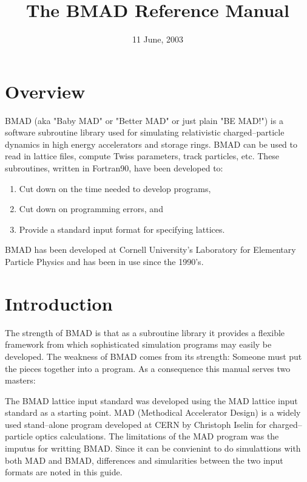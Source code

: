 \documentclass{book}
\begin{document}
\title{The BMAD Reference Manual}

\date{11 June, 2003}
\maketitle

\section*{Overview}

BMAD (aka "Baby MAD" or "Better MAD" or just plain "BE MAD!")
is a software subroutine library used for simulating 
relativistic charged--particle dynamics in high energy accelerators
and storage rings. BMAD can be used to read in lattice files, compute 
Twiss parameters, track particles, etc. 
These subroutines, written in  Fortran90, have been developed to:
\begin{enumerate}
\item Cut down on the time needed to develop programs,
\item Cut down on programming errors, and
\item Provide a standard input format for specifying lattices.
\end{enumerate}
BMAD has been developed at Cornell University's Laboratory for Elementary
Particle Physics and has been in use since the 1990's.

\break
\section*{Introduction}

The strength of BMAD is that as a subroutine library it provides a flexible
framework from which sophisticated simulation programs may easily be developed.
The weakness of BMAD comes from its strength: Someone must put the pieces 
together into a program. As a consequence this manual serves two masters:

The BMAD lattice input standard was developed using the MAD lattice
input standard as a starting point. MAD (Methodical Accelerator
Design) is a widely used stand--alone program developed at CERN by
Christoph Iselin for charged--particle optics calculations. The
limitations of the MAD program was the imputus for writting
BMAD. Since it can be convienint to do simulattions with both MAD and
BMAD, differences and simularities between the two input formats are
noted in this guide.
\end{document}
